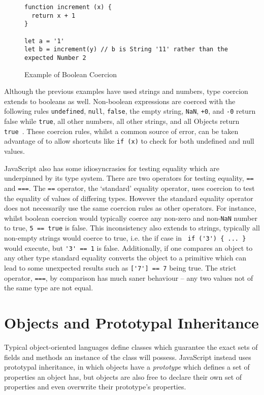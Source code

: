 \documentclass[]{final_report}
\begin{document}
\begin{figure}[t]
\begin{verbatim}
function increment (x) {
  return x + 1
}

let a = '1'
let b = increment(y) // b is String '11' rather than the expected Number 2
\end{verbatim}
\caption{\label{fig:js-increment-concat} Example of Boolean Coercion}
\end{figure} 

Although the previous examples have used strings and numbers, type coercion extends to booleans as well. Non-boolean expressions are coerced with the following rules \lstinline{undefined}, \lstinline{null}, \lstinline{false}, the empty string, \lstinline{NaN}, \lstinline{+0}, and \lstinline{-0} return false while \lstinline{true}, all other numbers, all other strings, and all Objects return \lstinline{true}~\cite{EcmaScript}. These coercion rules, whilst a common source of error, can be taken advantage of to allow shortcuts like \lstinline{if (x)} to check for both undefined and null values.

JavaScript also has some idiosyncrasies for testing equality which are underpinned by its type system. There are two operators for testing equality, \lstinline{==} and \lstinline{===}. The \lstinline{==} operator, the `standard' equality operator, uses coercion to test the equality of values of differing types. However the standard equality operator does not necessarily use the same coercion rules as other operators. For instance, whilst boolean coercion would typically coerce any non-zero and non-\lstinline{NaN} number to true, \lstinline{5 == true} is false. This inconsistency also extends to strings, typically all non-empty strings would coerce to true, i.e. the if case in \lstinline| if ('3') { ... }| would execute, but \lstinline{'3' == 1} is false. Additionally, if one compares an object to any other type standard equality converts the object to a primitive which can lead to some unexpected results such as \lstinline{['7'] == 7}  being true. The strict operator, \lstinline{===}, by comparison has much saner behaviour -- any two values not of the same type are not equal.

\section{Objects and Prototypal Inheritance}
Typical object-oriented languages define classes which guarantee the exact sets of fields and methods an instance of the class will possess. JavaScript instead uses prototypal inheritance, in which objects have a \textit{prototype} which defines  a set of properties an object has, but objects are also free to declare their own set of properties and even overwrite their prototype's properties. 
\end{document}
